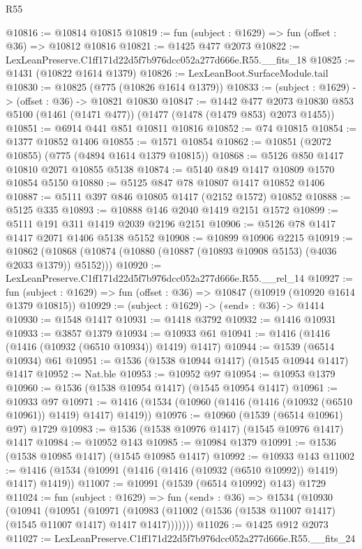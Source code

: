 \begin{lexlean}{R55}
\begin{coremodule}
{{@10816 := @10814 @10815
@10819 := fun (subject : @1629) => fun (offset : @36) => @10812 @10816
@10821 := @1425 @477 @2073
@10822 := LexLeanPreserve.C1ff171d22d5f7b976dcc052a277d666e.R55.__fits_18
@10825 := @1431 (@10822 @1614 @1379)
@10826 := LexLeanBoot.SurfaceModule.tail
@10830 := @10825 (@775 (@10826 @1614 @1379))
@10833 := (subject : @1629) -> (offset : @36) -> @10821 @10830
@10847 := @1442
    @477
    @2073
    @10830
    @853
    @5100
    (@1461 (@1471 @477))
    (@1477 (@1478 (@1479 @853) @2073 @1455))
@10851 := @6914 @441 @851 @10811 @10816
@10852 := @74 @10815
@10854 := @1377 @10852 @1406
@10855 := @1571 @10854
@10862 := @10851 (@2072 @10855) (@775 (@4894 @1614 @1379 @10815))
@10868 := @5126 @850 @1417 @10810 @2071 @10855 @5138
@10874 := @5140 @849 @1417 @10809 @1570 @10854 @5150
@10880 := @5125 @847 @78 @10807 @1417 @10852 @1406
@10887 := @5111 @397 @846 @10805 @1417 (@2152 @1572) @10852
@10888 := @5125 @335
@10893 := @10888 @146 @2040 @1419 @2151 @1572
@10899 := @5111 @191 @311 @1419 @2039 @2196 @2151
@10906 := @5126 @78 @1417 @1417 @2071 @1406 @5138 @5152
@10908 := @10899 @10906 @2215
@10919 := @10862 (@10868 (@10874 (@10880 (@10887 (@10893 @10908 @5153) (@4036 @2033 @1379)) @5152)))
@10920 := LexLeanPreserve.C1ff171d22d5f7b976dcc052a277d666e.R55.__rel_14
@10927 := fun (subject : @1629) => fun (offset : @36) => @10847 (@10919 (@10920 @1614 @1379 @10815))
@10929 := (subject : @1629) -> («end» : @36) -> @1414
@10930 := @1548 @1417
@10931 := @1418 @3792
@10932 := @1416 @10931
@10933 := @3857 @1379
@10934 := @10933 @61
@10941 := @1416 (@1416 (@1416 (@10932 (@6510 @10934)) @1419) @1417)
@10944 := @1539 (@6514 @10934) @61
@10951 := @1536 (@1538 @10944 @1417) (@1545 @10944 @1417) @1417
@10952 := Nat.ble
@10953 := @10952 @97
@10954 := @10953 @1379
@10960 := @1536 (@1538 @10954 @1417) (@1545 @10954 @1417)
@10961 := @10933 @97
@10971 := @1416 (@1534 (@10960 (@1416 (@1416 (@10932 (@6510 @10961)) @1419) @1417) @1419))
@10976 := @10960 (@1539 (@6514 @10961) @97) @1729
@10983 := @1536 (@1538 @10976 @1417) (@1545 @10976 @1417) @1417
@10984 := @10952 @143
@10985 := @10984 @1379
@10991 := @1536 (@1538 @10985 @1417) (@1545 @10985 @1417)
@10992 := @10933 @143
@11002 := @1416 (@1534 (@10991 (@1416 (@1416 (@10932 (@6510 @10992)) @1419) @1417) @1419))
@11007 := @10991 (@1539 (@6514 @10992) @143) @1729
@11024 := fun (subject : @1629) =>
  fun («end» : @36) =>
  @1534
    (@10930
      (@10941
        (@10951
          (@10971
            (@10983 (@11002 (@1536 (@1538 @11007 @1417) (@1545 @11007 @1417) @1417 @1417)))))))
@11026 := @1425 @912 @2073
@11027 := LexLeanPreserve.C1ff171d22d5f7b976dcc052a277d666e.R55.__fits_24
}}
\end{coremodule}
\end{lexlean}

